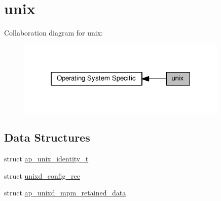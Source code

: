 \hypertarget{group__APACHE__OS__UNIX}{}\section{unix}
\label{group__APACHE__OS__UNIX}
Collaboration diagram for unix\+:
\nopagebreak
\begin{figure}[H]
\begin{center}
\leavevmode
\includegraphics[width=285pt]{group__APACHE__OS__UNIX}
\end{center}
\end{figure}
\subsection*{Data Structures}
\begin{DoxyCompactItemize}
\item 
struct \hyperlink{structap__unix__identity__t}{ap\+\_\+unix\+\_\+identity\+\_\+t}
\item 
struct \hyperlink{structunixd__config__rec}{unixd\+\_\+config\+\_\+rec}
\item 
struct \hyperlink{structap__unixd__mpm__retained__data}{ap\+\_\+unixd\+\_\+mpm\+\_\+retained\+\_\+data}
\end{DoxyCompactItemize}
